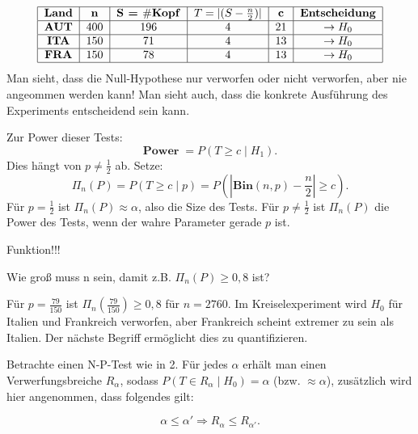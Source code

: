 \documentclass[10pt]{article}
\newcommand{\eqname}[1]{\tag*{#1}}%
\newenvironment{BSP}[1][]
{\begin{Beispiel}[frametitle=#1]}{\end{Beispiel}}
\begin{document}
\begin{BSP}[Beispiel 2.0.1 (Ist der Euro fair?)]
			\begin{align*}
			\begin{tabular}{|c|c|c|c|c|c|c|}
				\hline
				\textbf{Land} & \textbf{n} & \textbf{S = $\#$Kopf} & \textbf{$T = \vert(S - \frac{n}{2})\vert$} & \textbf{c} & \textbf{Entscheidung}\\
				\hline
				\textbf{AUT} & 400 & 196 & 4 & 21 & $\rightarrow H_0$\\
				\hline
				\textbf{ITA} & 150 & 71 & 4 & 13 &$\rightarrow H_0$\\
				\hline
				\textbf{FRA} & 150 & 78 & 4 & 13 &$\rightarrow H_0$\\
				\hline
			\end{tabular}
		\end{align*}
		Man sieht, dass die Null-Hypothese nur verworfen oder nicht verworfen, aber nie angeommen werden kann! Man sieht auch, dass die konkrete Ausführung des Experiments entscheidend sein kann. 
		
		Zur Power dieser Tests:
		\begin{equation*}
			\textbf{Power} \; = P(T \geq c \mid H_1).
		\end{equation*}
		Dies hängt von $p \neq \frac{1}{2}$ ab.
		Setze:
		\begin{equation*}
			\Pi_n(P) = P(T \geq c \mid p) = P\left(\left\vert \textbf{Bin}(n,p) - \frac{n}{2} \right\vert \geq c \right).
		\end{equation*}
		Für $p = \frac{1}{2}$ ist $\Pi_n (P) \approx \alpha$, also die Size des Tests. Für $p \neq \frac{1}{2}$ ist $\Pi_n(P)$ die Power des Tests, wenn der wahre Parameter gerade $p$ ist.
		
		Funktion!!!
		
		Wie groß muss n sein, damit z.B. $\Pi_n (P) \geq 0,8$ ist? 
		
		Für $p = \frac{79}{150}$ ist $\Pi_n \left(\frac{79}{150}\right) \geq 0,8$ für $n = 2760$. Im Kreiselexperiment wird $H_0$ für Italien und Frankreich verworfen, aber Frankreich scheint extremer zu sein als Italien. Der nächste Begriff ermöglicht dies zu quantifizieren.
	\end{BSP}
	
	Betrachte einen N-P-Test wie in 2. Für jedes $\alpha$ erhält man einen Verwerfungsbreiche $R_\alpha$, sodass $P(T \in R_\alpha \mid H_0) = \alpha$ (bzw. $\approx \alpha$), zusätzlich wird hier angenommen, dass folgendes gilt:
	
	\begin{equation*}
		\alpha \leq \alpha' \Rightarrow R_\alpha \leq R_{\alpha'}. \eqname{(1)}
	\end{equation*}
	
\end{document}
